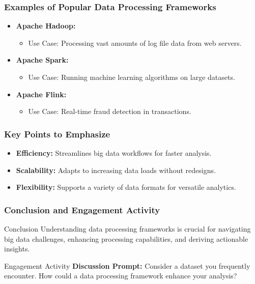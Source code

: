 \documentclass[aspectratio=169]{beamer}
\begin{document}
\begin{frame}[fragile]
    \frametitle{Examples of Popular Data Processing Frameworks}
    \begin{itemize}
        \item \textbf{Apache Hadoop:} 
        \begin{itemize}
            \item Use Case: Processing vast amounts of log file data from web servers.
        \end{itemize}
        \item \textbf{Apache Spark:} 
        \begin{itemize}
            \item Use Case: Running machine learning algorithms on large datasets.
        \end{itemize}
        \item \textbf{Apache Flink:} 
        \begin{itemize}
            \item Use Case: Real-time fraud detection in transactions.
        \end{itemize}
    \end{itemize}
\end{frame}

\begin{frame}[fragile]
    \frametitle{Key Points to Emphasize}
    \begin{itemize}
        \item \textbf{Efficiency:} Streamlines big data workflows for faster analysis.
        \item \textbf{Scalability:} Adapts to increasing data loads without redesigns.
        \item \textbf{Flexibility:} Supports a variety of data formats for versatile analytics.
    \end{itemize}
\end{frame}

\begin{frame}[fragile]
    \frametitle{Conclusion and Engagement Activity}
    \begin{block}{Conclusion}
        Understanding data processing frameworks is crucial for navigating big data challenges, enhancing processing capabilities, and deriving actionable insights.
    \end{block}
    \begin{block}{Engagement Activity}
        \textbf{Discussion Prompt:} Consider a dataset you frequently encounter. How could a data processing framework enhance your analysis?
    \end{block}
\end{frame}
\end{document}

